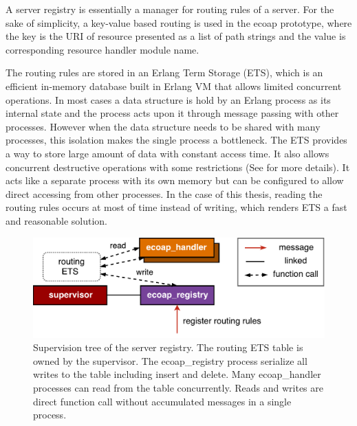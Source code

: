 A server registry is essentially a manager for routing rules of a server. For the sake of simplicity, a key-value based routing is used in the ecoap prototype, where the key is the URI of resource presented as a list of path strings and the value is corresponding resource handler module name. 

The routing rules are stored in an Erlang Term Storage (ETS), which is an efficient in-memory database built in Erlang VM that allows limited concurrent operations. In most cases a data structure is hold by an Erlang process as its internal state and the process acts upon it through message passing with other processes. However when the data structure needs to be shared with many processes, this isolation makes the single process a bottleneck. The ETS provides a way to store large amount of data with constant access time. It also allows concurrent destructive operations with some restrictions (See \autocite{ets} for more details). It acts like a separate process with its own memory but can be configured to allow direct accessing from other processes. In the case of this thesis, reading the routing rules occurs at most of time instead of writing, which renders ETS a fast and reasonable solution. 

\begin{figure}[!htbp]
\centering
\includegraphics[scale = 0.55]{coap_registry}
\caption[Supervision tree of the server registry]{Supervision tree of the server registry. The routing ETS table is owned by the supervisor. The ecoap\_registry process serialize all writes to the table including insert and delete. Many ecoap\_handler processes can read from the table concurrently. Reads and writes are direct function call without accumulated messages in a single process.}
\label{fig:coap_registry}
\end{figure}
 
